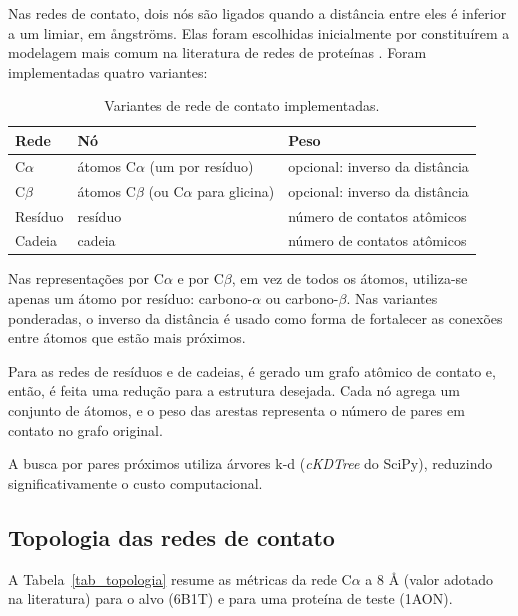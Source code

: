 \documentclass[12pt]{article}
\begin{document}
	Nas redes de contato, dois nós são ligados quando a distância entre eles é inferior a um limiar, em ångströms. Elas foram escolhidas inicialmente por constituírem a modelagem mais comum na literatura de redes de proteínas \citep{vishveshwara2002, greene2003, dipaola2013}. Foram implementadas quatro variantes:

	\begin{table}[H]
		\centering
		\caption{Variantes de rede de contato implementadas.}
		\begin{tabular}{lll}
			\toprule
			\textbf{Rede} & \textbf{Nó} & \textbf{Peso} \\
			\midrule
			C$\alpha$ & átomos C$\alpha$ (um por resíduo) & opcional: inverso da distância \\
			C$\beta$ & átomos C$\beta$ (ou C$\alpha$ para glicina) & opcional: inverso da distância \\
			Resíduo & resíduo & número de contatos atômicos \\
			Cadeia & cadeia & número de contatos atômicos \\
			\bottomrule
		\end{tabular}
		\label{tab_variantes}
	\end{table}

	Nas representações por C$\alpha$ e por C$\beta$, em vez de todos os átomos, utiliza-se apenas um átomo por resíduo: carbono-$\alpha$ ou carbono-$\beta$. Nas variantes ponderadas, o inverso da distância é usado como forma de fortalecer as conexões entre átomos que estão mais próximos.

	Para as redes de resíduos e de cadeias, é gerado um grafo atômico de contato e, então, é feita uma redução para a estrutura desejada. Cada nó agrega um conjunto de átomos, e o peso das arestas representa o número de pares em contato no grafo original.

	A busca por pares próximos utiliza árvores k-d (\textit{cKDTree} do SciPy), reduzindo significativamente o custo computacional.

	\subsection{Topologia das redes de contato}
	\label{sec_topologia_contato}

	A Tabela~\ref{tab_topologia} resume as métricas da rede C$\alpha$ a 8 Å (valor adotado na literatura) para o alvo (6B1T) e para uma proteína de teste (1AON).
\end{document}
